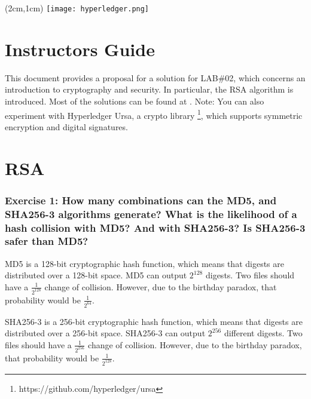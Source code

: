 \documentclass[12pt,a4paper]{article}
\begin{document}
\textblockorigin{-34pt}{-12pt}
\begin{textblock*}{10cm}(2cm,1cm)
\texttt{[image: hyperledger.png]}
\end{textblock*}

\section*{Instructors Guide}
This document provides a proposal for a solution for LAB\#02, which concerns an introduction to cryptography and security. In particular, the RSA algorithm is introduced. Most of the solutions can be found at \cite{conrad2016,rogaway2004,md2020}. Note: You can also experiment with Hyperledger Ursa, a crypto library \footnote{https://github.com/hyperledger/ursa}, which supports symmetric encryption and digital signatures.





\section{RSA}
\label{sec:rsa}

\subsubsection*{Exercise 1: How many combinations can the MD5, and SHA256-3 algorithms generate? What is the likelihood of a hash collision with MD5? And with SHA256-3? Is SHA256-3 safer than MD5?}

MD5 is a 128-bit cryptographic hash function, which means that digests are distributed over a 128-bit space. MD5 can output $2^{128}$ digests. Two files should have a $\frac{1}{2^{128}}$ change of collision. However, due to the birthday paradox, that probability would be $\frac{1}{2^{64}}$.

SHA256-3 is a 256-bit cryptographic hash function, which means that digests are distributed over a 256-bit space. SHA256-3 can output $2^{256}$ different digests.
Two files should have a $\frac{1}{2^{256}}$ change of collision. However, due to the birthday paradox, that probability would be $\frac{1}{2^{128}}$.
\end{document}
